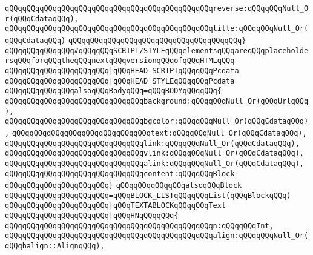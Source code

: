 \verb|qQQqqQQqqQQqqQQqqQQqqQQqqQQqqQQqqQQqqQQqqQQqqQQqreverse:qQQqqQQqNull_Or(qQQqCdataqQQq),|\newline
\verb|qQQqqQQqqQQqqQQqqQQqqQQqqQQqqQQqqQQqqQQqqQQqqQQqtitle:qQQqqQQqNull_Or(qQQqCdataqQQq)|\newline
\verb|qQQqqQQqqQQqqQQqqQQqqQQqqQQqqQQqqQQqqQQq}|\newline
\verb|qQQqqQQqqQQqqQQq#qQQqqQQqSCRIPT/STYLEqQQqelementsqQQqareqQQqplaceholdersqQQqforqQQqtheqQQqnextqQQqversionqQQqofqQQqHTMLqQQq|\newline
\verb|qQQqqQQqqQQqqQQqqQQqqQQq|\verb#|qQQqHEAD_SCRIPTqQQqqQQqPcdata#\newline
\verb|qQQqqQQqqQQqqQQqqQQqqQQq|\verb#|qQQqHEAD_STYLEqQQqqQQqPcdata#\newline
\newline
\verb|qQQqqQQqqQQqqQQqalsoqQQqBodyqQQq=qQQqBODYqQQqqQQq{|\newline
\verb|qQQqqQQqqQQqqQQqqQQqqQQqqQQqqQQqbackground:qQQqqQQqNull_Or(qQQqUrlqQQq),|\newline
\verb|qQQqqQQqqQQqqQQqqQQqqQQqqQQqqQQqbgcolor:qQQqqQQqNull_Or(qQQqCdataqQQq),|\newline
\verb|qQQqqQQqqQQqqQQqqQQqqQQqqQQqqQQqtext:qQQqqQQqNull_Or(qQQqCdataqQQq),|\newline
\verb|qQQqqQQqqQQqqQQqqQQqqQQqqQQqqQQqlink:qQQqqQQqNull_Or(qQQqCdataqQQq),|\newline
\verb|qQQqqQQqqQQqqQQqqQQqqQQqqQQqqQQqvlink:qQQqqQQqNull_Or(qQQqCdataqQQq),|\newline
\verb|qQQqqQQqqQQqqQQqqQQqqQQqqQQqqQQqalink:qQQqqQQqNull_Or(qQQqCdataqQQq),|\newline
\verb|qQQqqQQqqQQqqQQqqQQqqQQqqQQqqQQqcontent:qQQqqQQqBlock|\newline
\verb|qQQqqQQqqQQqqQQqqQQqqQQq}|\newline
\newline
\verb|qQQqqQQqqQQqqQQqalsoqQQqBlock|\newline
\verb|qQQqqQQqqQQqqQQqqQQqqQQq=qQQqBLOCK_LISTqQQqqQQqList(qQQqBlockqQQq)|\newline
\verb|qQQqqQQqqQQqqQQqqQQqqQQq|\verb#|qQQqTEXTABLOCKqQQqqQQqText#\newline
\verb|qQQqqQQqqQQqqQQqqQQqqQQq|\verb#|qQQqHNqQQqqQQq{#\newline
\verb|qQQqqQQqqQQqqQQqqQQqqQQqqQQqqQQqqQQqqQQqqQQqqQQqn:qQQqqQQqInt,|\newline
\verb|qQQqqQQqqQQqqQQqqQQqqQQqqQQqqQQqqQQqqQQqqQQqqQQqalign:qQQqqQQqNull_Or(qQQqhalign::AlignqQQq),|\newline
